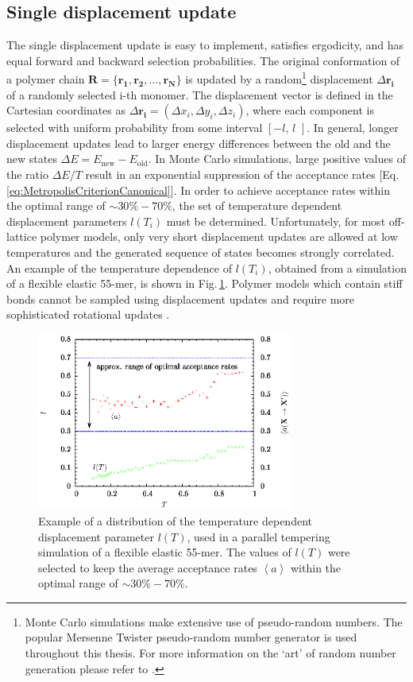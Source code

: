 \documentclass[12pt]{report}
\begin{document}
\subsection{Single displacement update}
The single displacement update is easy to implement, satisfies ergodicity, and has equal forward and backward selection probabilities. The original conformation of a polymer chain $\mathbf{R} = \{\mathbf{r_{1}},\mathbf{r_{2}},...,\mathbf{r_{N}}\}$ is updated by a random\footnote{Monte Carlo simulations make extensive use of pseudo-random numbers. The popular Mersenne Twister pseudo-random number generator \cite{Matsumoto1998} is used throughout this thesis. For more information on the `art' of random number generation please refer to \cite{Landau2000}.} displacement $\Delta \mathbf{r_{i}}$ of a randomly selected i-th monomer. The displacement vector is defined in the Cartesian coordinates as $\Delta \mathbf{r_{i}} = (\Delta x_{i}, \Delta y_{i}, \Delta z_{i})$, where each component is selected with uniform probability from some interval $[-l,\,l\,\,]$. In general, longer displacement updates lead to larger energy differences between the old and the new states $\Delta E = E_{\mathrm{new}} - E_{\mathrm{old}}$. In Monte Carlo simulations, large positive values of the ratio $\Delta E/T$ result in an exponential suppression of the acceptance rates [Eq. \ref{eq:MetropolisCriterionCanonical}]. In order to achieve acceptance rates within the optimal range of $\sim 30\%-70\%$, the set of temperature dependent displacement parameters $l(T_{i})$ must be determined. Unfortunately, for most off-lattice polymer models, only very short displacement updates are allowed at low temperatures and the generated sequence of states becomes strongly correlated. An example of the temperature dependence of $l(T_{i})$, obtained from a simulation of a flexible elastic 55-mer, is shown in Fig.\,\ref{fig:acceptanceRates}. Polymer models which contain stiff bonds cannot be sampled using displacement updates and require more sophisticated rotational updates \cite{Bachmann2014}.
%
\begin{figure}
\center
\includegraphics[width = 0.75\textwidth]{chapter3Figs/acceptanceRates.eps}
\caption{\label{fig:acceptanceRates}%
Example of a distribution of the temperature dependent displacement parameter $l(T)$, used in a parallel tempering simulation of a flexible elastic 55-mer. The values of $l(T)$ were selected to keep the average acceptance rates $\left\langle a \right\rangle$ within the optimal range of $\sim 30\%-70\%$.
}
\end{figure}
% 
\end{document}
